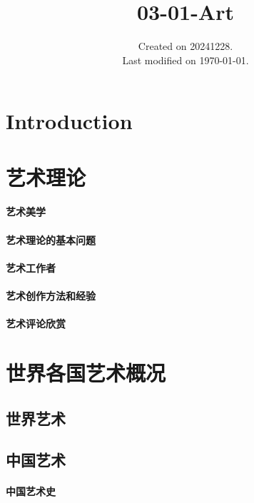 \documentclass[UTF8]{../RepresentationUniverse}
\begin{document}
\title{03-01-Art}
\date{Created on 20241228.\\   Last modified on \today.}
\maketitle
\tableofcontents


\chapter{Introduction}




\chapter{艺术理论}
    \subsubsection{艺术美学}
    \subsubsection{艺术理论的基本问题}
    \subsubsection{艺术工作者}
    \subsubsection{艺术创作方法和经验}
    \subsubsection{艺术评论欣赏}




\chapter{世界各国艺术概况}
\section{世界艺术}
\section{中国艺术}
    \subsubsection{中国艺术史}
\end{document}

